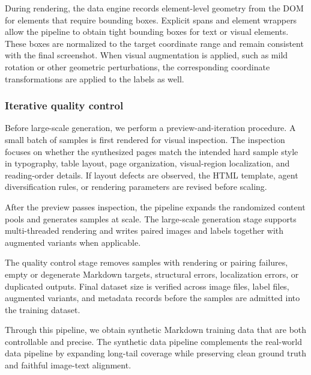 During rendering, the data engine records element-level geometry from the DOM for elements that require bounding boxes. Explicit spans and element wrappers allow the pipeline to obtain tight bounding boxes for text or visual elements. These boxes are normalized to the target coordinate range and remain consistent with the final screenshot. When visual augmentation is applied, such as mild rotation or other geometric perturbations, the corresponding coordinate transformations are applied to the labels as well.

\subsubsection{Iterative quality control}

Before large-scale generation, we perform a preview-and-iteration procedure. A small batch of samples is first rendered for visual inspection. The inspection focuses on whether the synthesized pages match the intended hard sample style in typography, table layout, page organization, visual-region localization, and reading-order details. If layout defects are observed, the HTML template, agent diversification rules, or rendering parameters are revised before scaling.

After the preview passes inspection, the pipeline expands the randomized content pools and generates samples at scale. The large-scale generation stage supports multi-threaded rendering and writes paired images and labels together with augmented variants when applicable.

The quality control stage removes samples with rendering or pairing failures, empty or degenerate Markdown targets, structural errors, localization errors, or duplicated outputs. Final dataset size is verified across image files, label files, augmented variants, and metadata records before the samples are admitted into the training dataset.

Through this pipeline, we obtain synthetic Markdown training data that are both controllable and precise. The synthetic data pipeline complements the real-world data pipeline by expanding long-tail coverage while preserving clean ground truth and faithful image-text alignment.
